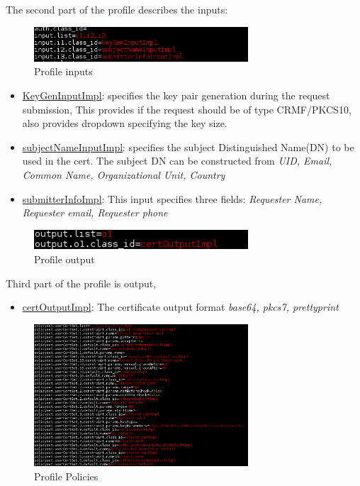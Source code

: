 \documentclass[12pt]{report}
\begin{document}
\begin{itemize}
            The second part of the profile describes the inputs:
            \begin{figure}[ht!]
                \centering
                \includegraphics[width=80mm]{Images/profile-2.png}
                \caption{Profile inputs}
            \end{figure}
            \begin{itemize}
                \item \underline{KeyGenInputImpl}: specifies the key pair generation during the request submission, This provides if the request
                    should be of type CRMF/PKCS10, also provides dropdown specifying the key size.
                \item \underline{subjectNameInputImpl}: specifies the subject Distinguished Name(DN) to be used in the cert. The subject DN 
                    can be constructed from \textit{UID, Email, Common Name, Organizational Unit, Country}
                \item \underline{submitterInfoImpl}: This input specifies three fields: \textit{Requester Name, Requester email, Requester phone}
            \end{itemize}
            \begin{figure}[ht!]
                \centering
                \includegraphics[width=80mm]{Images/profile-3.png}
                \caption{Profile output}
            \end{figure}
            Third part of the profile is output, 
            \begin{itemize}
                \item \underline{certOutputImpl}: The certificate output format \textit{base64, pkcs7, prettyprint}
            \end{itemize}
            \begin{figure}[ht!]
                \centering
                \includegraphics[width=80mm]{Images/profile-4.png}
                \caption{Profile Policies}
            \end{figure}


\end{itemize}
\end{document}
